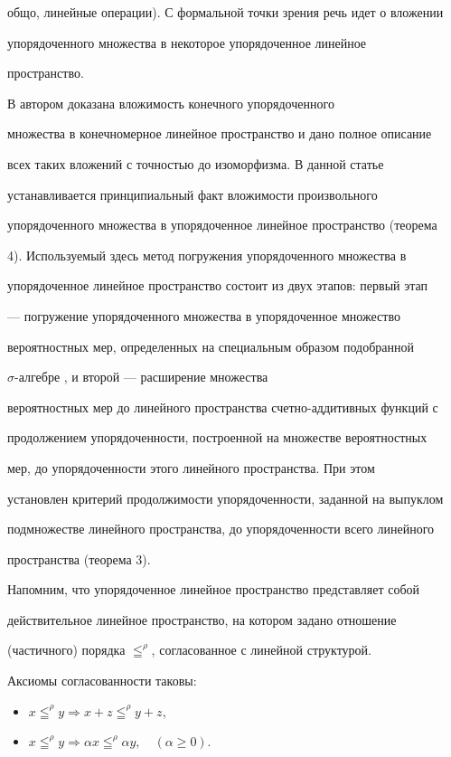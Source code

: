общо, линейные операции). С формальной точки зрения речь идет о вложении 


упорядоченного множества в некоторое упорядоченное линейное 


пространство. 


 


В \cite{1} автором доказана вложимость конечного упорядоченного 


множества в конечномерное линейное пространство и дано полное описание 


всех таких вложений с точностью до изоморфизма. В данной статье 


устанавливается принципиальный факт вложимости произвольного 


упорядоченного множества в упорядоченное линейное пространство (теорема 


4). Используемый здесь метод погружения упорядоченного множества в 


упорядоченное линейное пространство состоит из двух этапов: первый этап 


--- погружение упорядоченного множества в упорядоченное множество 


вероятностных мер, определенных на специальным образом подобранной 


$\sigma$-алгебре \cite{2}, и второй --- расширение множества 


вероятностных мер до линейного пространства счетно-аддитивных функций с 


продолжением упорядоченности, построенной на множестве вероятностных


мер, до упорядоченности этого линейного пространства. При этом 


установлен критерий продолжимости упорядоченности, заданной на выпуклом 


подмножестве линейного пространства, до упорядоченности всего линейного 


пространства (теорема 3). 


 


Напомним, что упорядоченное линейное пространство представляет собой 


действительное линейное пространство, на котором задано отношение 


(частичного) порядка $\leqq^\rho$, согласованное с линейной структурой. 


Аксиомы согласованности таковы: 


\begin{itemize} 


\item[(A1)] $x\leqq^\rho y \Longrightarrow 


x+z\leqq^\rho y+z$, 


\item[(A2)] $x\leqq^\rho y \Longrightarrow 


\alpha x\leqq^\rho \alpha y, \quad(\alpha\ge 0)$. 


\end{itemize} 


